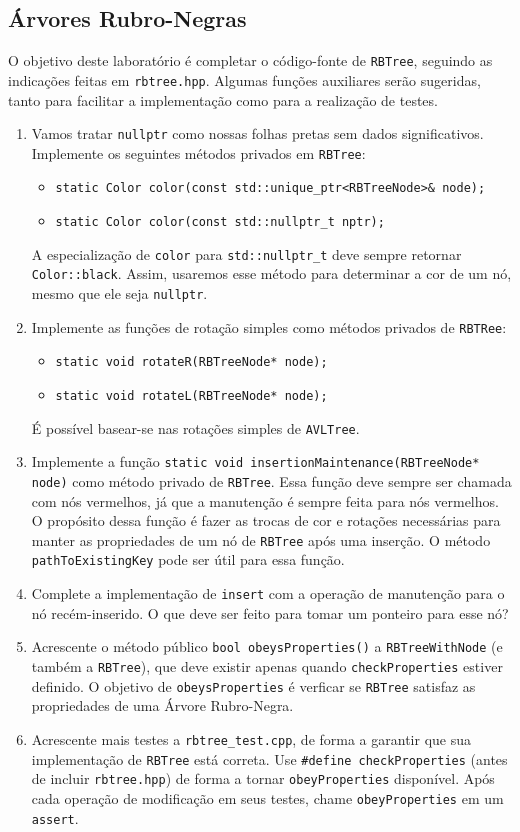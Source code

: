 \documentclass[11pt]{article}
\begin{document}
\subsection{Árvores Rubro-Negras}
\label{sec:orgef057c7}

O objetivo deste laboratório é completar o código-fonte de
\texttt{RBTree}, seguindo as indicações feitas em \texttt{rbtree.hpp}.  Algumas
funções auxiliares serão sugeridas, tanto para facilitar a
implementação como para a realização de testes.

\begin{enumerate}
\item Vamos tratar \texttt{nullptr} como nossas folhas pretas sem dados
significativos.  Implemente os seguintes métodos privados em
\texttt{RBTree}:
\begin{itemize}
\item \texttt{static Color color(const std::unique\_ptr<RBTreeNode>\& node);}
\item \texttt{static Color color(const std::nullptr\_t nptr);}
\end{itemize}
A especialização de \texttt{color} para \texttt{std::nullptr\_t} deve sempre
retornar \texttt{Color::black}.  Assim, usaremos esse método para
determinar a cor de um nó, mesmo que ele seja \texttt{nullptr}.
\item Implemente as funções de rotação simples como métodos privados
de \texttt{RBTRee}:
\begin{itemize}
\item \texttt{static void rotateR(RBTreeNode* node);}
\item \texttt{static void rotateL(RBTreeNode* node);}
\end{itemize}
É possível basear-se nas rotações simples de \texttt{AVLTree}.
\item Implemente a função \texttt{static void
      insertionMaintenance(RBTreeNode* node)} como método privado de
\texttt{RBTree}.  Essa função deve sempre ser chamada com nós
vermelhos, já que a manutenção é sempre feita para nós
vermelhos.  O propósito dessa função é fazer as trocas de cor e
rotações necessárias para manter as propriedades de um nó de
\texttt{RBTree} após uma inserção.  O método \texttt{pathToExistingKey} pode
ser útil para essa função.
\item Complete a implementação de \texttt{insert} com a operação de
manutenção para o nó recém-inserido.  O que deve ser feito para
tomar um ponteiro para esse nó?
\item Acrescente o método público \texttt{bool obeysProperties()} a
\texttt{RBTreeWithNode} (e também a \texttt{RBTree}), que deve existir apenas
quando \texttt{checkProperties} estiver definido.  O objetivo de
\texttt{obeysProperties} é verficar se \texttt{RBTree} satisfaz as
propriedades de uma Árvore Rubro-Negra.
\item Acrescente mais testes a \texttt{rbtree\_test.cpp}, de forma a garantir
que sua implementação de \texttt{RBTree} está correta.  Use \texttt{\#define
      checkProperties} (antes de incluir \texttt{rbtree.hpp}) de forma a
tornar \texttt{obeyProperties} disponível.  Após cada operação de
modificação em seus testes, chame \texttt{obeyProperties} em um
\texttt{assert}.
\end{enumerate}
\end{document}
